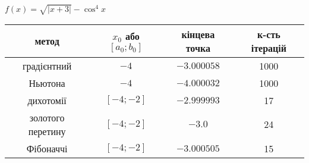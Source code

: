 \documentclass{extreport}
\begin{document}
\begin{center}
    $f(x) = \sqrt{|x+3|} - \cos^4 x$
    \nopagebreak


    \vspace{0.5em}

    \begin{tabular}{|c|c|c|c|}
    \hline
                    \bf метод & $x_0$ або $[a_0; b_0]$ &  \bf кінцева точка &  \bf к-сть ітерацій \\
                    \hline
              градієнтний &                    $-4$ &    $-3.000058$ &                   1000 \\
              \hline
                  Ньютона &                    $-4$ &    $-4.000032$ &                  1000 \\
                  \hline
                дихотомії &              $[-4; -2]$ &    $-2.999993$ &                  17 \\
                \hline
        золотого перетину &              $[-4; -2]$ &    $-3.0$ &                  24 \\
        \hline
                Фібоначчі &              $[-4; -2]$ &    $-3.000505$ &                  15 \\
                \hline
    \end{tabular}
\end{center}
\end{document}

